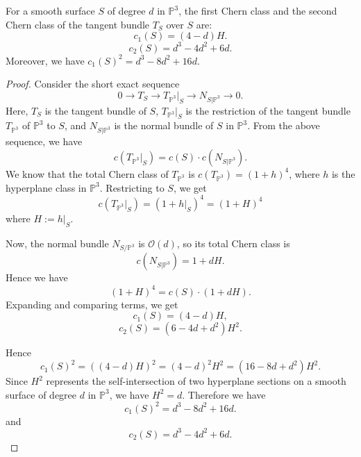 \documentclass[10pt,a4paper]{amsart}
\begin{document}
\begin{lemma}\label{LmmChernClassesOfSurfaceInP3}
For a smooth surface \( S \) of degree \( d \) in \(\mathbb{P}^3\),
the first Chern class and the second Chern class of the tangent bundle $T_S$ over $S$ are:
\[ c_1(S) = (4-d)H. \]
\[ c_2(S) = d^3 - 4d^2 + 6d. \]
Moreover, we have $c_1(S)^2 = d^3 - 8d^2 + 16d$.
\end{lemma}

\begin{proof} 
Consider the short exact sequence
\[ 
0 \to T_S \to T_{\mathbb{P}^3}|_S \to N_{S|\mathbb{P}^3} \to 0. 
\]
Here, \(T_S\) is the tangent bundle of \( S \), \( T_{\mathbb{P}^3}|_S \) is the restriction of the tangent bundle $T_{\mathbb{P}^3}$ of \(\mathbb{P}^3\) to \( S \), and \( N_{S|\mathbb{P}^3} \) is the normal bundle of \( S \) in \(\mathbb{P}^3\). From the above sequence, we have 
$$c(T_{\mathbb{P}^3}|_S) = c(S) \cdot c(N_{S|\mathbb{P}^3}).$$ 
We know that the total Chern class of \( T_{\mathbb{P}^3} \) is $c(T_{\mathbb{P}^3}) = (1 + h)^4$,
where \( h \) is the hyperplane class in \(\mathbb{P}^3\). Restricting to \( S \), we get 
$$c(T_{\mathbb{P}^3}|_S) = (1 + h|_S)^4=(1+H)^4$$ 
where $H:= h|_S $.  

Now, the normal bundle \( N_{S/\mathbb{P}^3} \) is \(\mathcal{O}(d) \), so its total Chern class is
\[ c(N_{S|\mathbb{P}^3}) = 1 + dH. \]
Hence we have 
\[ (1 + H)^4 = c(S) \cdot (1 + dH). \]
Expanding and comparing terms, we get
\[
c_1(S) = (4 - d)H, 
\]
\[
c_2(S)  = (6 - 4d + d^2)H^2. 
\]

Hence  \[ 
c_1(S)^2 = ((4 - d)H)^2 = (4 - d)^2H^2 = (16 - 8d + d^2)H^2.
\]
Since \( H^2 \) represents the self-intersection of two hyperplane sections on a smooth surface of degree \( d \) in \(\mathbb{P}^3\), we have \( H^2 = d \). Therefore we have
$$ 
c_1(S)^2 =d^3 - 8d^2 + 16d.
$$
and
$$c_2(S) = d^3 - 4d^2 + 6d. $$
\end{proof}
\end{document}
